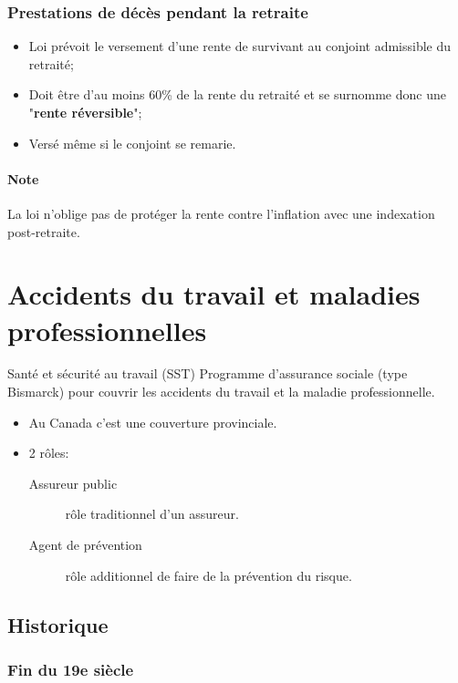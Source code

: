 \documentclass[10pt, french]{article}
\begin{document}
\begin{multicols*}{3}
\subsubsection*{Prestations de décès pendant la retraite}
\begin{itemize}[leftmargin = *]
	\item	Loi prévoit le versement d'une rente de survivant au conjoint admissible du retraité;
	\item	Doit être d'au moins 60\% de la rente du retraité et se surnomme donc une "\textbf{rente réversible}";
	\item	Versé même si le conjoint se remarie.
\end{itemize}

\paragraph{Note}	La loi n'oblige pas de protéger la rente contre l'inflation avec une indexation post-retraite.


\newpage

\section{Accidents du travail et maladies professionnelles}

\begin{conceptgen}{Santé et sécurité au travail (SST)}
Programme d'assurance sociale (type Bismarck) pour couvrir les accidents du travail et la maladie professionnelle. 
\begin{itemize}[leftmargin = *]
	\item	Au Canada c'est une couverture provinciale.
	\item	2 rôles:
		\begin{description}
		\item[Assureur public]	rôle traditionnel d'un assureur.
		\item[Agent de prévention]	rôle additionnel de faire de la prévention du risque.
		\end{description}
\end{itemize}
\end{conceptgen}

\subsection*{Historique}
\subsubsection*{Fin du 19e siècle}


\end{multicols*}
\end{document}
